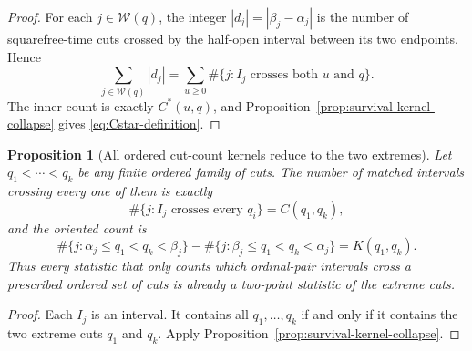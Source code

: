 \documentclass[11pt]{amsart}
\numberwithin{equation}{section}
\theoremstyle{plain}
\newtheorem{proposition}[theorem]{Proposition}
\theoremstyle{definition}
\theoremstyle{remark}
\begin{document}
\begin{proof}
For each $j\in\mathcal W(q)$, the integer $|d_j|=|\beta_j-\alpha_j|$ is the
number of squarefree-time cuts crossed by the half-open interval between its two
endpoints.  Hence
\begin{equation}
\label{eq:active-first-moment-double-count}
\sum_{j\in\mathcal W(q)}|d_j|
=\sum_{u\ge0}\#\{j:\text{$I_j$ crosses both $u$ and $q$}\}.
\end{equation}
The inner count is exactly $C^*(u,q)$, and
Proposition~\ref{prop:survival-kernel-collapse} gives
\eqref{eq:Cstar-definition}.
\end{proof}

\begin{proposition}[All ordered cut-count kernels reduce to the two extremes]
\label{prop:multicut-convexity-collapse}
Let $q_1<\cdots<q_k$ be any finite ordered family of cuts.  The number of
matched intervals crossing every one of them is exactly
\begin{equation}
\label{eq:multicut-unsigned-collapse}
\#\{j:\text{$I_j$ crosses every $q_i$}\}=C(q_1,q_k),
\end{equation}
and the oriented count is
\begin{equation}
\label{eq:multicut-signed-collapse}
\#\{j:\alpha_j\le q_1<q_k<\beta_j\}
-\#\{j:\beta_j\le q_1<q_k<\alpha_j\}=K(q_1,q_k).
\end{equation}
Thus every statistic that only counts which ordinal-pair intervals cross a
prescribed ordered set of cuts is already a two-point statistic of the extreme
cuts.
\end{proposition}

\begin{proof}
Each $I_j$ is an interval.  It contains all $q_1,\ldots,q_k$ if and only if it
contains the two extreme cuts $q_1$ and $q_k$.  Apply
Proposition~\ref{prop:survival-kernel-collapse}.
\end{proof}
\end{document}
